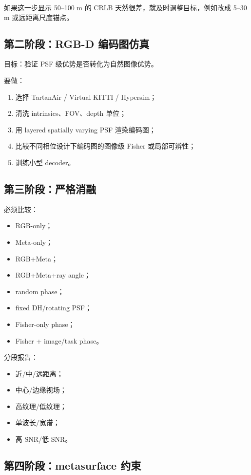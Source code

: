 \documentclass[11pt,a4paper,fontset=none]{ctexart}
\begin{document}
如果这一步显示 50--100 m 的 CRLB 天然很差，就及时调整目标，例如改成 5--30 m 或远距离尺度锚点。

\subsection{第二阶段：RGB-D 编码图仿真}

目标：验证 PSF 级优势是否转化为自然图像优势。

要做：
\begin{enumerate}
  \item 选择 TartanAir / Virtual KITTI / Hypersim；
  \item 清洗 intrinsics、FOV、depth 单位；
  \item 用 layered spatially varying PSF 渲染编码图；
  \item 比较不同相位设计下编码图的图像级 Fisher 或局部可辨性；
  \item 训练小型 decoder。
\end{enumerate}

\subsection{第三阶段：严格消融}

必须比较：
\begin{itemize}
  \item RGB-only；
  \item Meta-only；
  \item RGB+Meta；
  \item RGB+Meta+ray angle；
  \item random phase；
  \item fixed DH/rotating PSF；
  \item Fisher-only phase；
  \item Fisher + image/task phase。
\end{itemize}

分段报告：
\begin{itemize}
  \item 近/中/远距离；
  \item 中心/边缘视场；
  \item 高纹理/低纹理；
  \item 单波长/宽谱；
  \item 高 SNR/低 SNR。
\end{itemize}

\subsection{第四阶段：metasurface 约束}
\end{document}
